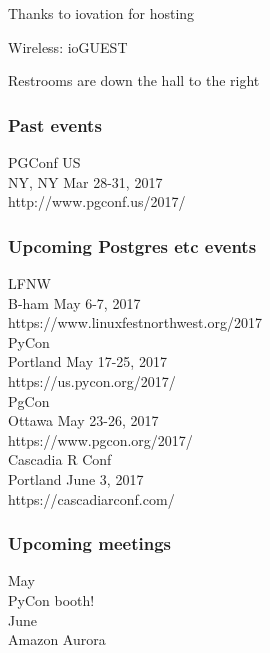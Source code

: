 \documentclass{beamer}
\begin{document}

\frame
{
  \begin{center}
  \item[]Thanks to iovation for hosting
  \item[]Wireless: ioGUEST
  \item[]Restrooms are down the hall to the right
  \end{center}
}

\frame
{
  \frametitle{Past events}
  \begin{center}
 {\large PGConf US\\}
NY, NY Mar 28-31, 2017\\
http://www.pgconf.us/2017/\\
  \vspace{5mm}
  \end{center}
}

\frame
{
  \frametitle{Upcoming Postgres etc events}
  \begin{center}
 {\large LFNW\\}
 B-ham May 6-7, 2017\\
 https://www.linuxfestnorthwest.org/2017\\
   \vspace{5mm}
 {\large PyCon\\}
 Portland May 17-25, 2017\\
 https://us.pycon.org/2017/\\
   \vspace{5mm}
 {\large PgCon\\}
 Ottawa May 23-26, 2017\\
 https://www.pgcon.org/2017/\\
   \vspace{5mm}
 {\large Cascadia R Conf\\}
 Portland June 3, 2017\\
 https://cascadiarconf.com/
  \end{center}
}
\frame
{
  \frametitle{Upcoming meetings}
  \begin{center}
{\large May\\}
PyCon booth!\\
\vspace{5mm}
{\large June\\}
Amazon Aurora\\
\vspace{5mm}
  \end{center}
}
\end{document}
